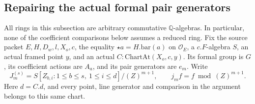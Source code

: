 \subsection{Repairing the actual formal pair generators}
\label{subsec:sr-source-frame-truncation}

All rings in this subsection are arbitrary commutative
\(\mathbb Q\)-algebras.  In particular, none of the
coefficient comparisons below assumes a reduced ring.
Fix the source packet \(E,H,D_w,l,X_o,c\), the equality
\(\star a=H.\mathrm{bar}(a)\) on \(\mathcal O_E\), a
\(c.F\)-algebra \(S\), an actual framed point \(y\), and
an actual \(C:\mathrm{ChartAt}(X_o,c,y)\).
Its formal group is \(G\), its coefficient actions are
\(A_a\), and its pair generators are \(e_m\).
Write
\[
 J_m^{(s)}=S[Z_{b,i}:1\le b\le s,\ 1\le i\le d]/
                         (Z)^{m+1},\qquad j_m f=f\bmod(Z)^{m+1}.
 \tag{FC1}
\]
Here \(d=C.d\), and every point, line generator and
comparison in the argument belongs to this same chart.

